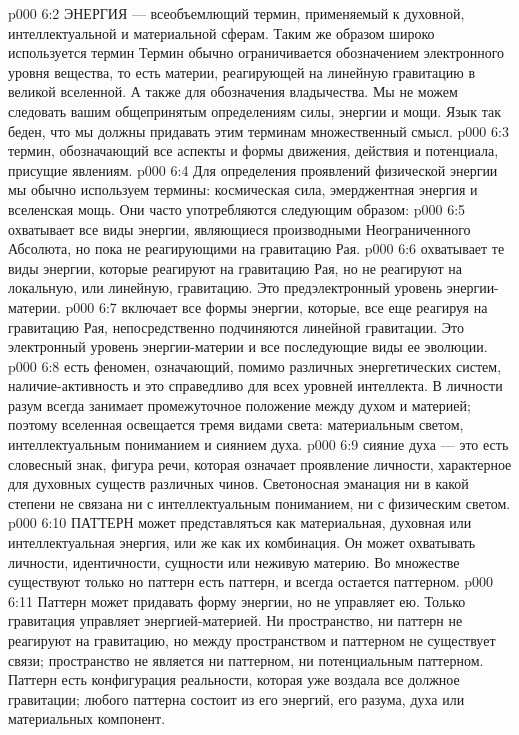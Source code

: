 \vs p000 6:2 \pc ЭНЕРГИЯ --- всеобъемлющий термин, применяемый к духовной, интеллектуальной и материальной сферам. Таким же образом широко используется термин  Термин  обычно ограничивается обозначением электронного уровня вещества, то есть материи, реагирующей на линейную гравитацию в великой вселенной. А также для обозначения владычества. Мы не можем следовать вашим общепринятым определениям силы, энергии и мощи. Язык так беден, что мы должны придавать этим терминам множественный смысл.
\vs p000 6:3 \pc {} термин, обозначающий все аспекты и формы движения, действия и потенциала, присущие явлениям.
\vs p000 6:4 Для определения проявлений физической энергии мы обычно используем термины: космическая сила, эмерджентная энергия и вселенская мощь. Они часто употребляются следующим образом:
\vs p000 6:5 \bibnobreakspace {} охватывает все виды энергии, являющиеся производными Неограниченного Абсолюта, но пока не реагирующими на гравитацию Рая.
\vs p000 6:6 \bibnobreakspace {} охватывает те виды энергии, которые реагируют на гравитацию Рая, но не реагируют на локальную, или линейную, гравитацию. Это предэлектронный уровень энергии\hyp{}материи.
\vs p000 6:7 \bibnobreakspace {} включает все формы энергии, которые, все еще реагируя на гравитацию Рая, непосредственно подчиняются линейной гравитации. Это электронный уровень энергии\hyp{}материи и все последующие виды ее эволюции.
\vs p000 6:8 \pc {} есть феномен, означающий, помимо различных энергетических систем, наличие\hyp{}активность  и это справедливо для всех уровней интеллекта. В личности разум всегда занимает промежуточное положение между духом и материей; поэтому вселенная освещается тремя видами света: материальным светом, интеллектуальным пониманием и сиянием духа.
\vs p000 6:9 \pc {} сияние духа --- это есть словесный знак, фигура речи, которая означает проявление личности, характерное для духовных существ различных чинов. Светоносная эманация ни в какой степени не связана ни с интеллектуальным пониманием, ни с физическим светом.
\vs p000 6:10 \pc ПАТТЕРН может представляться как материальная, духовная или интеллектуальная энергия, или же как их комбинация. Он может охватывать личности, идентичности, сущности или неживую материю. Во множестве существуют только  но паттерн есть паттерн, и всегда остается паттерном.
\vs p000 6:11 Паттерн может придавать форму энергии, но не управляет ею. Только гравитация управляет энергией\hyp{}материей. Ни пространство, ни паттерн не реагируют на гравитацию, но между пространством и паттерном не существует связи; пространство не является ни паттерном, ни потенциальным паттерном. Паттерн есть конфигурация реальности, которая уже воздала все должное гравитации;  любого паттерна состоит из его энергий, его разума, духа или материальных компонент.
